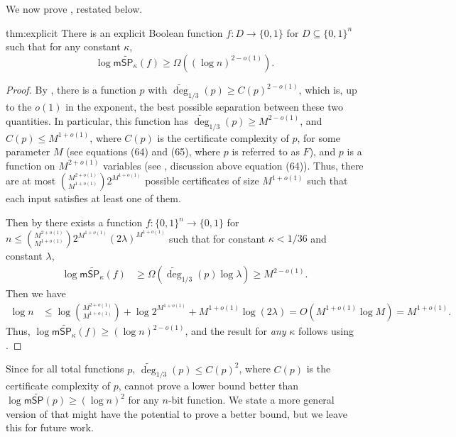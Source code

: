 \documentclass[11pt]{article}
\numberwithin{equation}{section}
\theoremstyle{definition}
\theoremstyle{plain}
\begin{document}
We now prove , restated below. %
\begin{reptheorem}{thm:explicit}
There is an explicit Boolean function $f:D\rightarrow\{0,1\}$ for $D\subseteq \{0,1\}^n$ such that for any constant $\kappa$,
$$\log\mathsf{m}\widetilde{\mathsf{SP}}_{\kappa}(f)\geq {\Omega}((\log n)^{2-o(1)}).$$
\end{reptheorem}
\begin{proof}
By \cite[Theorem 38]{BT17}, there is a function $p$ with $\widetilde{\deg}_{1/3}(p)\geq C(p)^{2-o(1)}$, which is, up to the $o(1)$ in the exponent, the best possible separation between these two quantities. In particular, this function has $\widetilde{\deg}_{1/3}(p)\geq M^{2-o(1)}$, and $C(p)\leq M^{1+o(1)}$, where $C(p)$ is the certificate complexity of $p$, for some parameter $M$ (see \cite{BT17} equations (64) and (65), where $p$ is referred to as $F$), and $p$ is a function on $M^{2+o(1)}$ variables (see \cite{BT17}, discussion above equation (64)). Thus, there are at most $\binom{M^{2+o(1)}}{M^{1+o(1)}}2^{M^{1+o(1)}}$ possible certificates of size $M^{1+o(1)}$ such that each input satisfies at least one of them. 

\noindent  %
Then by  there exists a function $f:\{0,1\}^n\rightarrow\{0,1\}$ for $n\leq \binom{M^{2+o(1)}}{M^{1+o(1)}}2^{M^{1+o(1)}}(2\lambda)^{M^{1+o(1)}}$ such that for constant $\kappa < 1/36$ and constant 
$\lambda$,   %
\begin{align*}
\log\mathsf{m}\widetilde{\mathsf{SP}}_{\kappa}(f) &\geq \Omega(\widetilde{\deg}_{1/3}(p)\log\lambda)\geq M^{2-o(1)}.
\end{align*}
Then we have %
\begin{align*}
\log n &\leq \log\binom{M^{2+o(1)}}{M^{1+o(1)}}+\log 2^{M^{1+o(1)}}+M^{1+o(1)}\log(2\lambda)=O(M^{1+o(1)}\log M)=M^{1+o(1)}.
\end{align*}
Thus, $\log\mathsf{m}\widetilde{\mathsf{SP}}_{\kappa}(f)\geq (\log n)^{2-o(1)}$, and the result for \emph{any} $\kappa$ follows using .
\end{proof}

Since for all total functions $p$, $\widetilde{\deg}_{1/3}(p)\leq C(p)^2$, where $C(p)$ is the certificate complexity of $p$, 
%
cannot  %
prove a lower bound better than $\log \mathsf{m}\widetilde{\mathsf{SP}}(p)\geq (\log n)^2$ for any $n$-bit function. We state a more general version of  that might have the potential to prove a better bound, but we leave this %
%
for %
future work. 
\end{document}
